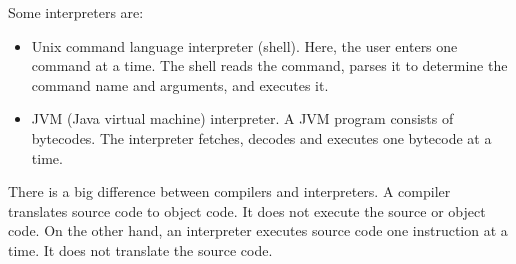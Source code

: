 \documentclass[a4paper, openany]{memoir}
\begin{document}
Some interpreters are:
\begin{itemize}
    \item Unix command language interpreter (shell). Here, the user enters one command at a time. The shell reads the command, parses it to determine the command name and arguments, and executes it.
    \item JVM (Java virtual machine) interpreter. A JVM program consists of bytecodes. The interpreter fetches, decodes and executes one bytecode at a time.
\end{itemize}

There is a big difference between compilers and interpreters. A compiler translates source code to object code. It does not execute the source or object code. On the other hand, an interpreter executes source code one instruction at a time. It does not translate the source code.
\end{document}
